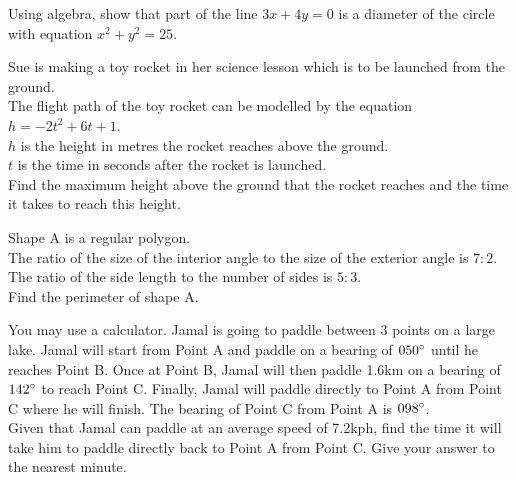 \documentclass{exam}
\begin{document}
\begin{questions}
\begin{center}
    \end{center}
    \newpage

    \question Using algebra, show that part of the line $3x+4y=0$ is a diameter of the circle with equation $x^2+y^2=25$.
    \newpage

    \question Sue is making a toy rocket in her science lesson which is to be launched from the ground.\\
    The flight path of the toy rocket can be modelled by the equation\\ $h=-2t^2+6t+1$.\\
    $h$ is the height in metres the rocket reaches above the ground.\\
    $t$ is the time in seconds after the rocket is launched.\\

    Find the maximum height above the ground that the rocket reaches and the time it takes to reach this height.
    \newpage

    \question Shape A is a regular polygon.\\
    The ratio of the size of the interior angle to the size of the exterior angle is $7:2$.
    The ratio of the side length to the number of sides is $5:3$.\\
    Find the perimeter of shape A.
    \newpage

    \question You may use a calculator. Jamal is going to paddle between 3 points on a large lake.
    Jamal will start from Point A and paddle on a bearing of $050\degree$ until he reaches Point B. Once at Point B, Jamal will then paddle 1.6km on a bearing of $142\degree$ to reach Point C. Finally, Jamal will paddle directly to Point A from Point C where he will finish.
    The bearing of Point C from Point A is $098\degree$.\\

    Given that Jamal can paddle at an average speed of 7.2kph, find the time it will take him to paddle directly back to Point A from Point C. Give your answer to the nearest minute.
    \newpage


\end{questions}
\end{document}

